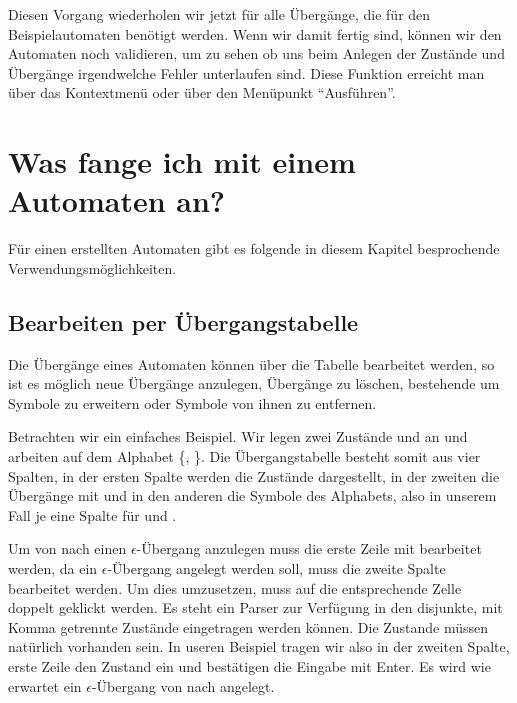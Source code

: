 Diesen Vorgang wiederholen wir jetzt für alle Übergänge, die
für den Beispielautomaten benötigt werden. Wenn wir damit fertig sind, können
wir den Automaten noch validieren, um zu sehen ob uns beim Anlegen der Zustände
und Übergänge irgendwelche Fehler unterlaufen sind. Diese Funktion erreicht man
über das Kontextmenü oder über den Menüpunkt "`Ausführen"'.

\section{Was fange ich mit einem Automaten an?}

Für einen erstellten Automaten gibt es folgende in diesem Kapitel besprochende
Ver\-wen\-dungs\-möglich\-keiten.


\subsection{Bearbeiten per Übergangstabelle}

Die Übergänge eines Automaten können über die Tabelle bearbeitet werden, so ist
es möglich neue Übergänge anzulegen, Übergänge zu löschen, bestehende um
Symbole zu erweitern oder Symbole von ihnen zu entfernen.\vspace{10pt}

Betrachten wir ein einfaches Beispiel. Wir legen zwei Zustände  und
 an und arbeiten auf dem Alphabet \{, \}. Die
Übergangstabelle besteht somit aus vier Spalten, in der ersten Spalte werden die
Zustände dargestellt, in der zweiten die Übergänge mit \Symbol{$\epsilon$} und in
den anderen die Symbole des Alphabets, also in unserem Fall je eine Spalte für
 und .\vspace{10pt}

Um von  nach  einen $\epsilon$-Übergang anzulegen muss die
erste Zeile mit  bearbeitet werden, da ein $\epsilon$-Übergang
angelegt werden soll, muss die zweite Spalte bearbeitet werden. Um dies
umzusetzen, muss auf die entsprechende Zelle doppelt geklickt werden. Es steht
ein Parser zur Verfügung in den disjunkte, mit Komma getrennte Zustände eingetragen
werden können. Die Zustande müssen natürlich vorhanden sein. In useren Beispiel
tragen wir also in der zweiten Spalte, erste Zeile den Zustand  ein
und bestätigen die Eingabe mit Enter. Es wird wie erwartet ein
$\epsilon$-Übergang von  nach  angelegt.\vspace{10pt}

